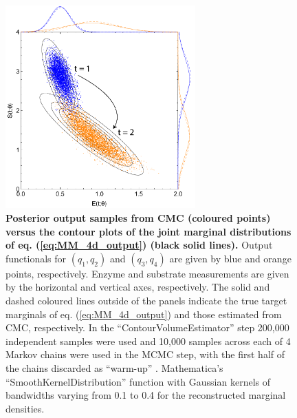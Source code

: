 \begin{figure}[H]
\centerline{\includegraphics[width=0.65\textwidth]{../figures/mm_4d_outputs.pdf}}
\caption{\textbf{Posterior output samples from CMC (coloured points) versus the contour plots of the joint marginal distributions of eq. (\ref{eq:MM_4d_output}) (black solid lines).} Output functionals for $(q_1,q_2)$ and $(q_3,q_4)$ are given by blue and orange points, respectively. Enzyme and substrate measurements are given by the horizontal and vertical axes, respectively. The solid and dashed coloured lines outside of the panels indicate the true target marginals of eq. (\ref{eq:MM_4d_output}) and those estimated from CMC, respectively. In the ``ContourVolumeEstimator'' step 200,000 independent samples were used and 10,000 samples across each of 4 Markov chains were used in the MCMC step, with the first half of the chains discarded as ``warm-up'' \cite{lambert2018Student}. Mathematica's ``SmoothKernelDistribution'' function with Gaussian kernels \cite{mathematica} of bandwidths varying from 0.1 to 0.4 for the reconstructed marginal densities.}
\label{fig:mm_4d_outputs}
\end{figure}


